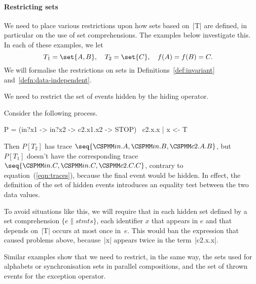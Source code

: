 \paragraph{Restricting sets}

We need to place various restrictions upon how sets based on~|T| are defined,
in particular on the use of set comprehensions.  The examples below
investigate this.  In each of these examples, we let 
\[
T_1 = \set{A,B}, \quad T_2 = \set{C}, \quad f(A) = f(B) =  C.
\]
We will formalise the restrictions on sets in Definitions~\ref{def:invariant}
and~\ref{defn:data-independent}. 

We need to restrict the set of events hidden by the hiding operator.  
%
\begin{example}
Consider the following process.
\begin{cspm}
P = (in?x1 -> in?x2 -> c2.x1.x2 -> STOP) \ {c2.x.x | x <- T}
\end{cspm}
Then $P[T_2]$ has trace $\seq{\M{in}.A, \M{in}.B, \M{c2}.A.B}$, but $P[T_1]$
doesn't have the corresponding trace $\seq{\M{in}.C, \M{in}.C, \M{c2}.C.C}$,
contrary to equation~(\ref{eqn:traces}), because the final event would be
hidden.  In effect, the definition of the set of hidden events introduces an
equality test between the two data values.
\end{example}


To avoid situations like this, we will require that in each hidden set defined
by a set comprehension $\{ e \| stmts\}$, each identifier $x$ that appears in
$e$ and that depends on~|T| occurs at most once in~$e$.  This would ban the
expression  that caused problems above, because~|x|
appears twice in the term~|c2.x.x|.

Similar examples show that we need to restrict, in the same way, the sets
used for alphabets or synchronisation sets in parallel compositions, and the
set of thrown events for the exception operator.

